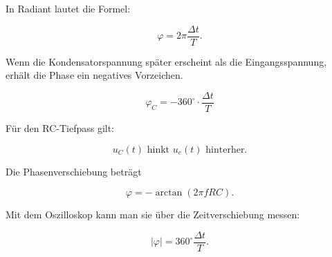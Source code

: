 In Radiant lautet die Formel:

\begin{equation}
	\varphi
	=
	2\pi \frac{\Delta t}{T}.
	\label{eq:rc-phase-oszilloskop-radiant}
\end{equation}

Wenn die Kondensatorspannung später erscheint als die Eingangsspannung, erhält
die Phase ein negatives Vorzeichen.

\begin{equation}
	\boxed{
		\varphi_C
		=
		-360^\circ \cdot \frac{\Delta t}{T}
	}
	\label{eq:rc-phase-oszilloskop-endformel}
\end{equation}

\begin{DidacticBox}
	\label{box:rc-phase-praktischer-merksatz}
	Für den RC-Tiefpass gilt:
	
	\[
	u_C(t) \text{ hinkt } u_e(t) \text{ hinterher.}
	\]
	
	Die Phasenverschiebung beträgt
	
	\[
	\varphi
	=
	-\arctan(2\pi f RC).
	\]
	
	Mit dem Oszilloskop kann man sie über die Zeitverschiebung messen:
	
	\[
	|\varphi|
	=
	360^\circ \frac{\Delta t}{T}.
	\]
\end{DidacticBox}